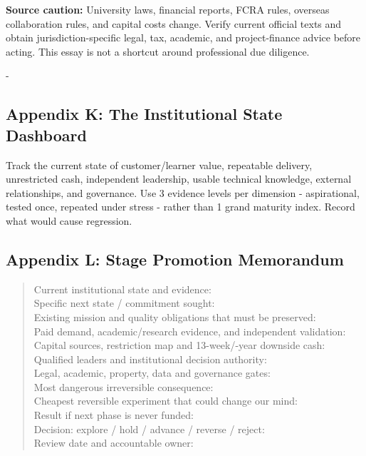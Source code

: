 \textbf{Source caution:} University laws, financial reports, FCRA rules, overseas collaboration rules, and capital costs change. Verify current official texts and obtain jurisdiction-specific legal, tax, academic, and project-finance advice before acting. This essay is not a shortcut around professional due diligence.

-

\subsection{Appendix K: The Institutional State Dashboard}

Track the current state of customer/\allowbreak learner value, repeatable delivery, unrestricted cash, independent leadership, usable technical knowledge, external relationships, and governance. Use 3 evidence levels per dimension - aspirational, tested once, repeated under stress - rather than 1 grand maturity index. Record what would cause regression.

\subsection{Appendix L: Stage Promotion Memorandum}

\begin{quote}\small\ttfamily
Current institutional state and evidence:\\
Specific next state / commitment sought:\\
Existing mission and quality obligations that must be preserved:\\
Paid demand, academic/\allowbreak research evidence, and independent validation:\\
Capital sources, restriction map and 13-week/-year downside cash:\\
Qualified leaders and institutional decision authority:\\
Legal, academic, property, data and governance gates:\\
Most dangerous irreversible consequence:\\
Cheapest reversible experiment that could change our mind:\\
Result if next phase is never funded:\\
Decision: explore / hold / advance / reverse / reject:\\
Review date and accountable owner:\\
\end{quote}

